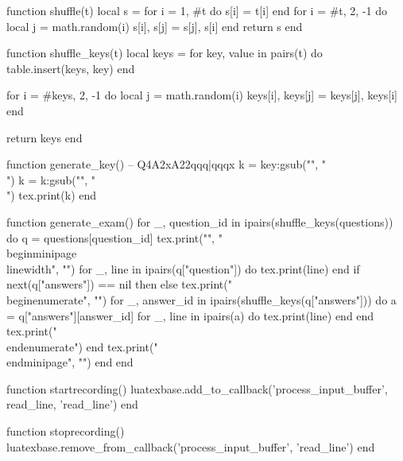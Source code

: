 \begin{luacode*}
function shuffle(t)
    local s = {}
    for i = 1, #t do s[i] = t[i] end
    for i = #t, 2, -1 do
        local j = math.random(i)
        s[i], s[j] = s[j], s[i]
    end
    return s
end

function shuffle_keys(t)
    local keys = {}
    for key, value in pairs(t) do
        table.insert(keys, key)
    end

    for i = #keys, 2, -1 do
        local j = math.random(i)
        keys[i], keys[j] = keys[j], keys[i]
    end
    
    return keys
end


function generate_key()
    -- Q4A2{x}A22{qqq|qqqx}
    k = key:gsub("{", "\\{")
    k = k:gsub("}", "\\}")    
    tex.print(k)
end


function generate_exam()
    for _, question_id in ipairs(shuffle_keys(questions)) do
        q = questions[question_id]
        tex.print("", "\\begin{minipage}{\\linewidth}", "")
        for _, line in ipairs(q["question"]) do
            tex.print(line)
        end
        if next(q["answers"]) == nil then else
	        tex.print("\\begin{enumerate}", "")
	        for _, answer_id in ipairs(shuffle_keys(q["answers"])) do
	            a = q["answers"][answer_id]
	            for _, line in ipairs(a) do
	                tex.print(line)
	            end
	        end
	        tex.print("\\end{enumerate}")
	    end
        tex.print("\\end{minipage}", "")
    end
end

function startrecording()
    luatexbase.add_to_callback('process_input_buffer', read_line, 'read_line')
end

function stoprecording()
    luatexbase.remove_from_callback('process_input_buffer', 'read_line')
end
\end{luacode*}

\setlength{\columnsep}{5mm}

\setlength{\parskip}{5mm}
\setlength{\parindent}{0pt}

\newcommand{\Repeat}[2]{\foreach \n in {1,...,#1}{#2}}

\newcommand{\startquestions}{\directlua{startrecording()}}
\newcommand{\stopquestions}{}


